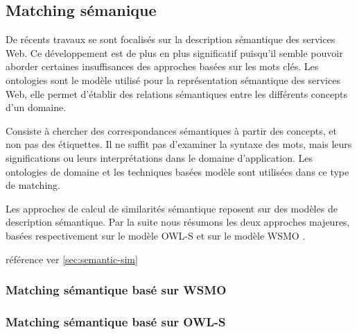   \subsection{Matching sémanique}
  \label{sec:matching-semanique}  
  {\color{red} De récents travaux se sont focalisés sur la description
    sémantique des services Web. Ce développement est de plus en plus
    significatif puisqu'il semble pouvoir aborder certaines
    insuffisances des approches basées sur les mots clés. Les
    ontologies sont le modèle utilisé pour la représentation
    sémantique des services Web, elle permet d’établir des relations
    sémantiques entre les différents concepts d'un
    domaine. \cite{chelbabi2012decouverte}

    Consiste à chercher des correspondances sémantiques à partir des
    concepts, et non pas des étiquettes. Il ne suffit pas d'examiner
    la syntaxe des mots, mais leurs significations ou leurs
    interprétations dans le domaine d'application. Les ontologies de
    domaine et les techniques basées modèle sont utilisées dans ce
    type de matching.

    Les approches de calcul de similarités sémantique reposent sur des
    modèles de description sémantique. Par la suite nous résumons
    les deux approches majeures, basées respectivement sur le modèle
    \textsc{OWL-S} et sur le modèle \textsc{WSMO} \cite{elie2010}.

    référence ver \ref{sec:semantic-sim}
  }  

    \subsubsection{Matching sémantique basé sur WSMO}
    \label{sec:match-wsmo}
    \cite{paolucci2002semantic, keller2004wsmo}

    \subsubsection{Matching sémantique basé sur OWL-S}
    \label{sec:match-owls}    
    \cite{paolucci2002semantic,benatallah2003request,
        benatallah2005automating, martin2004owl}


